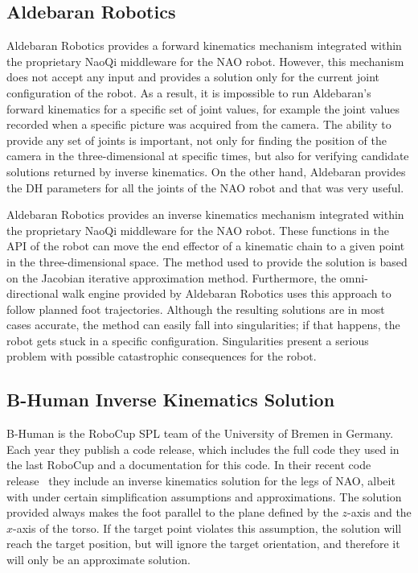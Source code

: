 \subsection{Aldebaran Robotics}

Aldebaran Robotics provides a forward kinematics mechanism integrated within the proprietary NaoQi middleware for the NAO robot. However, this mechanism does not accept any input and provides a solution only for the current joint configuration of the robot. As a result, it is impossible to run Aldebaran's forward kinematics for a specific set of joint values, for example the joint values recorded when a specific picture was acquired from the camera. The ability to provide any set of joints is important, not only for finding the position of the camera in the three-dimensional at specific times, but also for verifying candidate solutions returned by inverse kinematics. On the other hand, Aldebaran provides the DH parameters for all the joints of the NAO robot and that was very useful.

Aldebaran Robotics provides an inverse kinematics mechanism integrated within the proprietary NaoQi middleware for the NAO robot. These functions in the API of the robot can move the end effector of a kinematic chain to a given point in the three-dimensional space. The method used to provide the solution is based on the Jacobian iterative approximation method. Furthermore, the omni-directional walk engine provided by Aldebaran Robotics uses this approach to follow planned foot trajectories. Although the resulting solutions are in most cases accurate, the method can easily fall into singularities; if that happens, the robot gets stuck in a specific configuration. Singularities present a serious problem with possible catastrophic consequences for the robot. 

\subsection{B-Human Inverse Kinematics Solution}
B-Human is the RoboCup SPL team of the University of Bremen in Germany. Each year they publish a code release, which includes the full code they used in the last RoboCup and a documentation for this code. In their recent code release~\cite{bhuman} they include an inverse kinematics solution for the legs of NAO, albeit with under certain simplification assumptions and approximations. The solution provided always makes the foot parallel to the plane defined by the $z$-axis and the $x$-axis of the torso. If the target point violates this assumption, the solution will reach the target position, but will ignore the target orientation, and therefore it will only be an approximate solution. 

